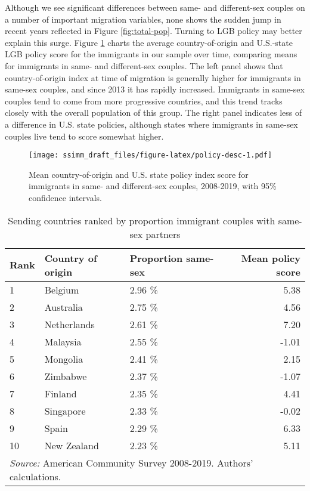 \documentclass[
  11pt,
]{article}
\begin{document}
Although we see significant differences between same- and different-sex couples on a number of important migration variables, none shows the sudden jump in recent years reflected in Figure \ref{fig:total-pop}. Turning to LGB policy may better explain this surge. Figure \ref{fig:policy-desc} charts the average country-of-origin and U.S.-state LGB policy score for the immigrants in our sample over time, comparing means for immigrants in same- and different-sex couples. The left panel shows that country-of-origin index at time of migration is generally higher for immigrants in same-sex couples, and since 2013 it has rapidly increased. Immigrants in same-sex couples tend to come from more progressive countries, and this trend tracks closely with the overall population of this group. The right panel indicates less of a difference in U.S. state policies, although states where immigrants in same-sex couples live tend to score somewhat higher.

\begin{figure}
\centering
\texttt{[image: ssimm\_draft\_files/figure-latex/policy-desc-1.pdf]}
\caption{\label{fig:policy-desc}Mean country-of-origin and U.S. state policy index score for immigrants in same- and different-sex couples, 2008-2019, with 95\% confidence intervals.}
\end{figure}

\begin{table}

\caption{\label{tab:country-tab}Sending countries ranked by proportion immigrant couples with same-sex partners}
\centering
\begin{tabular}[t]{lllr}
\toprule
Rank & Country of origin & Proportion same-sex & Mean policy score\\
\midrule
1 & Belgium & 2.96 \% & 5.38\\
2 & Australia & 2.75 \% & 4.56\\
3 & Netherlands & 2.61 \% & 7.20\\
4 & Malaysia & 2.55 \% & -1.01\\
5 & Mongolia & 2.41 \% & 2.15\\
6 & Zimbabwe & 2.37 \% & -1.07\\
7 & Finland & 2.35 \% & 4.41\\
8 & Singapore & 2.33 \% & -0.02\\
9 & Spain & 2.29 \% & 6.33\\
10 & New Zealand & 2.23 \% & 5.11\\
\bottomrule
\multicolumn{4}{l}{\rule{0pt}{1em}\textit{Source:} American Community Survey 2008-2019. Authors' calculations.}\\
\end{tabular}
\end{table}
\end{document}
